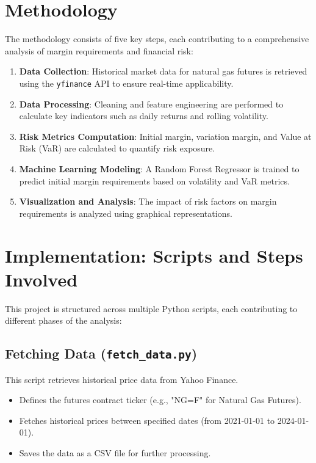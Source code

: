 \documentclass[a4paper,12pt]{article}
\begin{document}
\section{Methodology}
The methodology consists of five key steps, each contributing to a comprehensive analysis of margin requirements and financial risk:

\begin{enumerate}
    \item \textbf{Data Collection}: Historical market data for natural gas futures is retrieved using the \texttt{yfinance} API to ensure real-time applicability.
    \item \textbf{Data Processing}: Cleaning and feature engineering are performed to calculate key indicators such as daily returns and rolling volatility.
    \item \textbf{Risk Metrics Computation}: Initial margin, variation margin, and Value at Risk (VaR) are calculated to quantify risk exposure.
    \item \textbf{Machine Learning Modeling}: A Random Forest Regressor is trained to predict initial margin requirements based on volatility and VaR metrics.
    \item \textbf{Visualization and Analysis}: The impact of risk factors on margin requirements is analyzed using graphical representations.
\end{enumerate}



\section{Implementation: Scripts and Steps Involved}
This project is structured across multiple Python scripts, each contributing to different phases of the analysis:

\subsection{Fetching Data (\texttt{fetch\_data.py})}
This script retrieves historical price data from Yahoo Finance.
\begin{itemize}
    \item Defines the futures contract ticker (e.g., "NG=F" for Natural Gas Futures).
    \item Fetches historical prices between specified dates (from 2021-01-01 to 2024-01-01).
    \item Saves the data as a CSV file for further processing.
\end{itemize}
\end{document}

